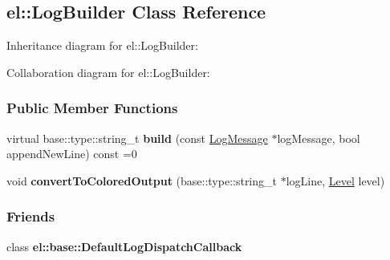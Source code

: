 \hypertarget{a00042}{}\subsection{el\+:\+:Log\+Builder Class Reference}
\label{a00042}


Inheritance diagram for el\+:\+:Log\+Builder\+:


Collaboration diagram for el\+:\+:Log\+Builder\+:
\subsubsection*{Public Member Functions}
\begin{DoxyCompactItemize}
\item 
\hypertarget{a00042_a633b373a3bb9d3e17bdd664aeba4dbc8}{}virtual base\+::type\+::string\+\_\+t {\bfseries build} (const \hyperlink{a00050}{Log\+Message} $\ast$log\+Message, bool append\+New\+Line) const =0\label{a00042_a633b373a3bb9d3e17bdd664aeba4dbc8}

\item 
\hypertarget{a00042_a229244f323f25bdbd7725f8bbf983a17}{}void {\bfseries convert\+To\+Colored\+Output} (base\+::type\+::string\+\_\+t $\ast$log\+Line, \hyperlink{a00183_ab0ac6091262344c52dd2d3ad099e8e36}{Level} level)\label{a00042_a229244f323f25bdbd7725f8bbf983a17}

\end{DoxyCompactItemize}
\subsubsection*{Friends}
\begin{DoxyCompactItemize}
\item 
\hypertarget{a00042_a42b1de96d584ae4fecbfc2b9aff95052}{}class {\bfseries el\+::base\+::\+Default\+Log\+Dispatch\+Callback}\label{a00042_a42b1de96d584ae4fecbfc2b9aff95052}

\end{DoxyCompactItemize}
